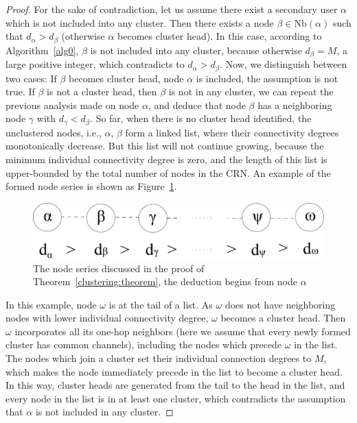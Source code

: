 \documentclass[times]{ettauth}
\newcommand{\ie}{i.e., }
\theoremstyle{mytheoremstyle}
\theoremstyle{mytheoremstyle}
\theoremstyle{mytheoremstyle}
\begin{document}
\begin{proof}
For the sake of contradiction, let us assume there exist a secondary user $\alpha$ which is not included into any cluster.
Then there exists a node $\beta\in \text{Nb}(\alpha)$ such that $d_{\alpha} > d_{\beta}$ (otherwise $\alpha$ becomes cluster head). 
In this case, according to Algorithm~\ref{alg0}, $\beta$ is not included into any cluster, because otherwise $d_{\beta} = M$, a large positive integer, which contradicts to $d_{\alpha} > d_{\beta}$.
Now, we distinguish between two cases: 
If $\beta$ becomes cluster head, node $\alpha$ is included, the assumption is not true.
If $\beta$ is not a cluster head, then $\beta$ is not in any cluster, we can repeat the previous analysis made on node $\alpha$, and deduce that node $\beta$ has a neighboring node $\gamma$ with $d_{\gamma} < d_{\beta}$.
So far, when there is no cluster head identified, the unclustered nodes, \ie $\alpha$, $\beta$ form a linked list, where their connectivity degrees monotonically decrease.
But this list will not continue growing, because the minimum individual connectivity degree is zero, and the length of this list is upper-bounded by the total number of nodes in the CRN.
An example of the formed node series is shown as Figure~\ref{lemma1}.
\begin{figure}[ht!]
  \centering
\includegraphics[width=0.6\linewidth]{lemma1.pdf}
	\caption{The node series discussed in the proof of Theorem~\ref{clustering:theorem}, the deduction begins from node $\alpha$}
	\label{lemma1}
\end{figure}
In this example, node $\omega$ is at the tail of a list.
As $\omega$ does not have neighboring nodes with lower individual connectivity degree, $\omega$ becomes a cluster head.
Then $\omega$ incorporates all its one-hop neighbors (here we assume that every newly formed cluster has common channels), including the nodes which precede $\omega$ in the list.
The nodes which join a cluster set their individual connection degrees to $M$, which makes the node immediately precede in the list to become a cluster head.
In this way, cluster heads are generated from the tail to the head in the list, and every node in the list is in at least one cluster, which contradicts the assumption that $\alpha$ is not included in any cluster.
\end{proof}
\end{document}
